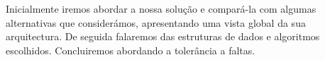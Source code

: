
Inicialmente iremos abordar a nossa solução e compará-la com algumas alternativas que considerámos, apresentando uma vista global da sua arquitectura. De seguida falaremos das estruturas de dados e algoritmos escolhidos. Concluiremos abordando a tolerância a faltas.